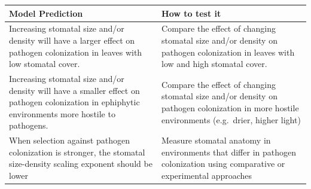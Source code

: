 \documentclass[utf8]{frontiersSCNS}
\begin{document}
\begin{longtable}[]{@{}ll@{}}
\toprule
\begin{minipage}[b]{0.50\columnwidth}\raggedright
Model Prediction\strut
\end{minipage} & \begin{minipage}[b]{0.44\columnwidth}\raggedright
How to test it\strut
\end{minipage}\tabularnewline
\midrule
\endhead
\begin{minipage}[t]{0.50\columnwidth}\raggedright
Increasing stomatal size and/or density will have a larger effect on
pathogen colonization in leaves with low stomatal cover.\strut
\end{minipage} & \begin{minipage}[t]{0.44\columnwidth}\raggedright
Compare the effect of changing stomatal size and/or density on pathogen
colonization in leaves with low and high stomatal cover.\strut
\end{minipage}\tabularnewline
\begin{minipage}[t]{0.50\columnwidth}\raggedright
Increasing stomatal size and/or density will have a smaller effect on
pathogen colonization in ephiphytic environments more hostile to
pathogens.\strut
\end{minipage} & \begin{minipage}[t]{0.44\columnwidth}\raggedright
Compare the effect of changing stomatal size and/or density on pathogen
colonization in more hostile environments (e.g.~drier, higher
light)\strut
\end{minipage}\tabularnewline
\begin{minipage}[t]{0.50\columnwidth}\raggedright
When selection against pathogen colonization is stronger, the stomatal
size-density scaling exponent should be lower\strut
\end{minipage} & \begin{minipage}[t]{0.44\columnwidth}\raggedright
Measure stomatal anatomy in environments that differ in pathogen
colonization using comparative or experimental approaches\strut
\end{minipage}\tabularnewline
\bottomrule
\end{longtable}
\end{document}
